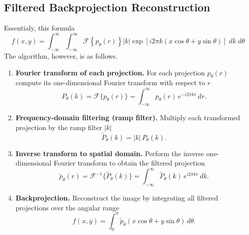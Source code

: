 \documentclass[../../../main.tex]{subfiles}
\begin{document}
\subsection{Filtered Backprojection Reconstruction}
Essentialy, this formula
\begin{equation*}
    f(x,y) = \int_{-\infty }^{\infty}\int_{-\infty }^{\infty}\mathcal{F} \left\{ p_\theta(r) \right\} |k| \exp \left[{i 2\pi k (x\cos\theta + y\sin\theta)}\right] \; dk \; d\theta
\end{equation*}
The algorithm, however, is as follows.
\begin{enumerate}
    \item \textbf{Fourier transform of each projection.}
          For each projection $p_\theta(r)$ compute its one-dimensional Fourier transform with respect to $r$
          \[
              P_{\theta}(k) = \mathcal{F}\{p_{\theta}(r)\}
              = \int_{-\infty}^{\infty} p_{\theta}(r)\, e^{-i2\pi kr}\,dr.
          \]

    \item \textbf{Frequency-domain filtering (ramp filter).} Multiply each transformed projection by the ramp filter $|k|$
          \[
              \tilde{P}_{\theta}(k) = |k|\, P_{\theta}(k).
          \]

    \item \textbf{Inverse transform to spatial domain.}
          Perform the inverse one-dimensional Fourier transform to obtain the filtered projection
          \[
              \tilde{p}_{\theta}(r) = \mathcal{F}^{-1}\{\tilde{P}_{\theta}(k)\}
              = \int_{-\infty}^{\infty} \tilde{P}_{\theta}(k)\, e^{i2\pi kr}\,dk.
          \]

    \item \textbf{Backprojection.} Reconstruct the image by integrating all filtered projections over the angular range
          \[
              f(x,y) = \int_{0}^{\pi}
              \tilde{p}_{\theta}(x\cos\theta + y\sin\theta)\, d\theta.
          \]
\end{enumerate}
\end{document}
